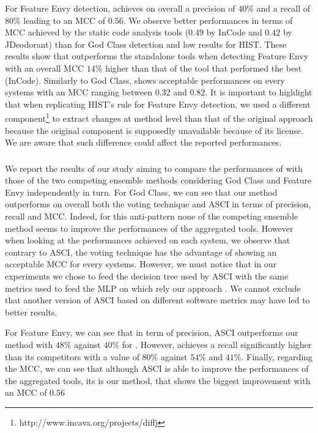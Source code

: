 For Feature Envy detection, \NAME{} achieves on overall a precision of $40\%$ and a recall of $80\%$ leading to an MCC of $0.56$. We observe better performances in terms of MCC achieved by the static code analysis tools ($0.49$ by InCode and $0.42$ by JDeodorant) than for God Class detection and low results for HIST. These results show that \NAME{} outperforms the standalone tools when detecting Feature Envy with an overall MCC $14\%$ higher than that of the tool that performed the best (InCode). Similarly to God Class, \NAME{} shows acceptable performances on every systems with an MCC ranging between $0.32$ and $0.82$. It is important to highlight that when replicating HIST's rule for Feature Envy detection, we used a different component\footnote{http://www.incava.org/projects/diffj} to extract changes at method level than that of the original approach because the original component is supposedly unavailable because of its license. We are aware that such difference could affect the reported performances.


\subsubsection{\RQtwo{}}
We report the results of our study aiming to compare the performances of \NAME{} with those of the two competing ensemble methods considering God Class and Feature Envy independently in turn. For God Class, we can see that our method outperforms on overall both the voting technique and ASCI in terms of precision, recall and MCC. Indeed, for this anti-pattern none of the competing ensemble method seems to improve the performances of the aggregated tools. However when looking at the performances achieved on each system, we observe that contrary to ASCI, the voting technique has the advantage of showing an acceptable MCC for every systems. However, we must notice that in our experiments we chose to feed the decision tree used by ASCI with the same metrics used to feed the MLP on which rely our approach \NAME{}. We cannot exclude that another version of ASCI based on different software metrics may have led to better results.

For Feature Envy, we can see that in term of precision, ASCI outperforms our method with $48\%$ against $40\%$ for \NAME{}. However, \NAME{} achieves a recall significantly higher than its competitors with a value of $80\%$ against $54\%$ and $41\%$. Finally, regarding the MCC, we can see that although ASCI is able to improve the performances of the aggregated tools, its is our method, \NAME{} that shows the biggest improvement with an MCC of $0.56$


